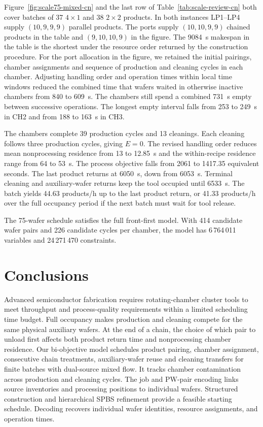 \documentclass[final,5p,times,twocolumn]{elsarticle}
\begin{document}
Figure~\ref{fig:scale75-mixed-cn} and the last row of Table~\ref{tab:scale-review-cn} both cover batches of 37 $4\times1$ and 38 $2\times2$ products. In both instances LP1--LP4 supply $(10,9,9,9)$ parallel products. The ports supply $(10,10,9,9)$ chained products in the table and $(9,10,10,9)$ in the figure. The 9084~s makespan in the table is the shortest under the resource order returned by the construction procedure. For the port allocation in the figure, we retained the initial pairings, chamber assignments and sequence of production and cleaning cycles in each chamber. Adjusting handling order and operation times within local time windows reduced the combined time that wafers waited in otherwise inactive chambers from 840 to 609~s. The chambers still spend a combined 731~s empty between successive operations. The longest empty interval falls from 253 to 249~s in CH2 and from 188 to 163~s in CH3.

The chambers complete 39 production cycles and 13 cleanings. Each cleaning follows three production cycles, giving $E=0$. The revised handling order reduces mean nonprocessing residence from 13 to 12.85~s and the within-recipe residence range from 64 to 53~s. The process objective falls from 2061 to 1417.35 equivalent seconds. The last product returns at 6050~s, down from 6053~s. Terminal cleaning and auxiliary-wafer returns keep the tool occupied until 6533~s. The batch yields 44.63 products/h up to the last product return, or 41.33 products/h over the full occupancy period if the next batch must wait for tool release.

The 75-wafer schedule satisfies the full front-first model. With 414 candidate wafer pairs and 226 candidate cycles per chamber, the model has 6\,764\,011 variables and 24\,271\,470 constraints.

\FloatBarrier
\section{Conclusions}
\label{sec:conclusion-cn}

Advanced semiconductor fabrication requires rotating-chamber cluster tools to meet throughput and process-quality requirements within a limited scheduling time budget. Full occupancy makes production and cleaning compete for the same physical auxiliary wafers. At the end of a chain, the choice of which pair to unload first affects both product return time and nonprocessing chamber residence. Our bi-objective model schedules product pairing, chamber assignment, consecutive chain treatments, auxiliary-wafer reuse and cleaning transfers for finite batches with dual-source mixed flow. It tracks chamber contamination across production and cleaning cycles. The job and PW-pair encoding links source inventories and processing positions to individual wafers. Structured construction and hierarchical SPBS refinement provide a feasible starting schedule. Decoding recovers individual wafer identities, resource assignments, and operation times.
\end{document}
